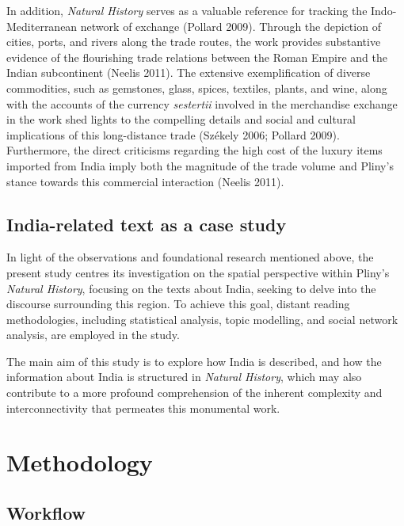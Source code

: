 \documentclass[
  12pt,
]{article}
\begin{document}
In addition, \emph{Natural History} serves as a valuable reference for
tracking the Indo-Mediterranean network of exchange (Pollard 2009).
Through the depiction of cities, ports, and rivers along the trade
routes, the work provides substantive evidence of the flourishing trade
relations between the Roman Empire and the Indian subcontinent (Neelis
2011). The extensive exemplification of diverse commodities, such as
gemstones, glass, spices, textiles, plants, and wine, along with the
accounts of the currency \emph{sestertii} involved in the merchandise
exchange in the work shed lights to the compelling details and social
and cultural implications of this long-distance trade (Székely 2006;
Pollard 2009). Furthermore, the direct criticisms regarding the high
cost of the luxury items imported from India imply both the magnitude of
the trade volume and Pliny's stance towards this commercial interaction
(Neelis 2011).

\hypertarget{india-related-text-as-a-case-study}{%
\subsection{India-related text as a case
study}\label{india-related-text-as-a-case-study}}

In light of the observations and foundational research mentioned above,
the present study centres its investigation on the spatial perspective
within Pliny's \emph{Natural History}, focusing on the texts about
India, seeking to delve into the discourse surrounding this region. To
achieve this goal, distant reading methodologies, including statistical
analysis, topic modelling, and social network analysis, are employed in
the study.

The main aim of this study is to explore how India is described, and how
the information about India is structured in \emph{Natural History},
which may also contribute to a more profound comprehension of the
inherent complexity and interconnectivity that permeates this monumental
work.

\hypertarget{sec-methodology}{%
\section{Methodology}\label{sec-methodology}}

\hypertarget{workflow}{%
\subsection{Workflow}\label{workflow}}
\end{document}
